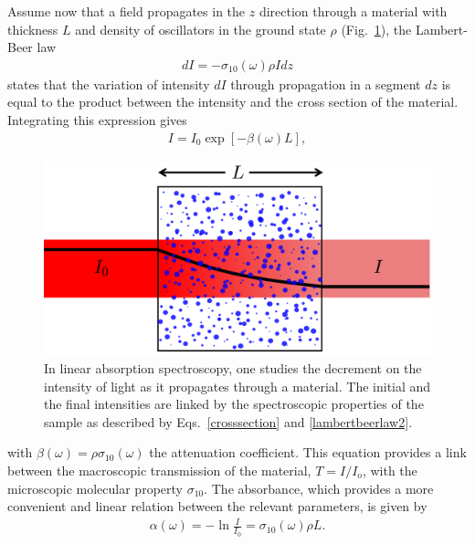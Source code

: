 Assume now that a field propagates in the $z$ direction through a material with thickness $L$ and density of oscillators in the ground state $\rho$ (Fig.\ \ref{AbsorptionLambertBeer}), the Lambert-Beer law
\begin{eqnarray}
d I = - \sigma_\text{10} (\omega) \rho I {d z}
\label{lambertbeerlaw}
\end{eqnarray}
states that the variation of intensity $d I$ through propagation in a segment $dz$ is equal to the product between the intensity and the cross section of the material. Integrating this expression gives
\begin{eqnarray}
I = I_0 \exp [- \beta (\omega) L ],
\label{lambertbeerlaw2}
\end{eqnarray}
\begin{figure}[t!]
	\centering
	\includegraphics[width=0.6\figwidth]{chapters/Chapter3_Methods2/Graphs/LambertBeerAbs.png} %
	\caption{In linear absorption spectroscopy, one studies the decrement on the intensity of light as it propagates through a material. The initial and the final intensities are linked by the spectroscopic properties of the sample as described by Eqs.\ \ref{crosssection} and \ref{lambertbeerlaw2}.}
	\label{AbsorptionLambertBeer}
\end{figure}
\noindent with $\beta (\omega) = \rho \sigma_\text{10} (\omega)$ the attenuation coefficient. This equation provides a link between the macroscopic transmission of the material, $T = I/I_o$, with the microscopic molecular property $\sigma_{10}$. The absorbance, which provides a more convenient and linear relation between the relevant parameters, is given by
\begin{eqnarray}
\alpha (\omega) = - \ln \frac{I}{I_0} = \sigma_{10} (\omega) \rho L.
\label{absorbance}
\end{eqnarray}




